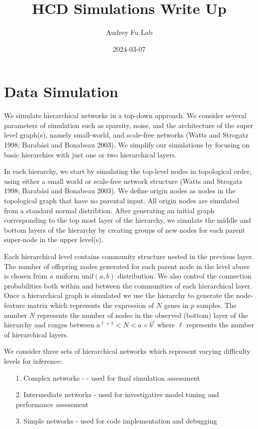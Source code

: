\documentclass[
]{article}
\title{HCD Simulations Write Up}
\author{Audrey Fu Lab}
\date{2024-03-07}
\begin{document}
\maketitle

\section*{Data Simulation}

We simulate hierarchical networks in a top-down approach. We consider
several parameters of simulation such as sparsity, noise, and the
architecture of the super level graph(s), namely small-world, and
scale-free networks (Watts and Strogatz 1998; Barabási and Bonabeau
2003). We simplify our simulations by focusing on basic hierarchies with
just one or two hierarchical layers.

In each hierarchy, we start by simulating the top-level nodes in
topological order, using either a small world or scale-free network
structure (Watts and Strogatz 1998; Barabási and Bonabeau 2003). We
define origin nodes as nodes in the topological graph that have no
parental input. All origin nodes are simulated from a standard normal
distribtion. After generating an initial graph corresponding to the top
most layer of the hierarchy, we simulate the middle and bottom layers of
the hierarchy by creating groups of new nodes for each parent super-node
in the upper level(s).

Each hierarchical level contains community structure nested in the
previous layer. The number of offspring nodes generated for each parent
node in the level above is chosen from a uniform \(\text{unif}(a,b)\)
distribution. We also control the connection probabilities both within
and between the communities of each hierarchical layer. Once a
hierarchical graph is simulated we use the hierarchy to generate the
node-feature matrix which represents the expression of \(N\) genes in
\(p\) samples. The number \(N\) represents the number of nodes in the
observed (bottom) layer of the hierarchy and ranges between
\(a^{\ell+1}<N<a\times b^\ell\) where \(\ell\) represents the number of
hierarchical layers.

We consider three sets of hierarchical networks which represent varying
difficulty levels for inference:

\begin{itemize}
  \item[1.] Complex networks - - used for final simulation assessment 
  \item[2.] Intermediate networks - used for investigative model tuning and performance assessment 
  \item[3.] Simple networks - used for code implementation and debugging
\end{itemize}
\end{document}
